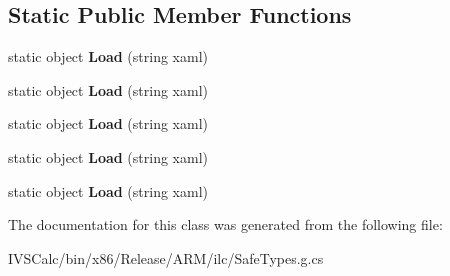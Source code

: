 \subsection*{Static Public Member Functions}
\begin{DoxyCompactItemize}
\item 
\mbox{\label{class_windows_1_1_u_i_1_1_xaml_1_1_markup_1_1_xaml_reader_adb969028d731a02de12e5368591f3b5f}} 
static object {\bfseries Load} (string xaml)
\item 
\mbox{\label{class_windows_1_1_u_i_1_1_xaml_1_1_markup_1_1_xaml_reader_adb969028d731a02de12e5368591f3b5f}} 
static object {\bfseries Load} (string xaml)
\item 
\mbox{\label{class_windows_1_1_u_i_1_1_xaml_1_1_markup_1_1_xaml_reader_adb969028d731a02de12e5368591f3b5f}} 
static object {\bfseries Load} (string xaml)
\item 
\mbox{\label{class_windows_1_1_u_i_1_1_xaml_1_1_markup_1_1_xaml_reader_adb969028d731a02de12e5368591f3b5f}} 
static object {\bfseries Load} (string xaml)
\item 
\mbox{\label{class_windows_1_1_u_i_1_1_xaml_1_1_markup_1_1_xaml_reader_adb969028d731a02de12e5368591f3b5f}} 
static object {\bfseries Load} (string xaml)
\end{DoxyCompactItemize}


The documentation for this class was generated from the following file\+:\begin{DoxyCompactItemize}
\item 
I\+V\+S\+Calc/bin/x86/\+Release/\+A\+R\+M/ilc/Safe\+Types.\+g.\+cs\end{DoxyCompactItemize}
